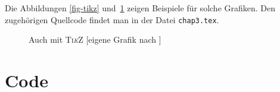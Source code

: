 \newcommand{\foo}[5]{
  \begin{scope}[xshift=#1cm]
    \begin{scope}[x  = {(1cm,0cm)}, y  = {(0.4cm,0.6cm)}, z  = {(0cm,1cm)}]
      \begin{scope}[canvas is xz plane at y=#4]
        \filldraw[black, fill=#3!70!white] ($(0,0) + (0,#5)$) rectangle ($(0.5,#2) + (0,#5)$);
      \end{scope}
      \pgfmathsetmacro{\z}{#2 + #5}
      \begin{scope}[canvas is xy plane at z=\z]
        \filldraw[black, fill=#3!50!white] (0,#4) -- (0.5,#4) -- ($(0.5,1) + (0,#4)$) -- ($(0,1) + (0,#4)$) -- cycle;
      \end{scope}
      \begin{scope}[canvas is yz plane at x=0.5]
        \filldraw[black, fill=#3!90!white] (#4,#5) rectangle ($(1,#2) + (#4,#5)$);
      \end{scope}
    \end{scope}
  \end{scope}
}

Die Abbildungen \ref{fig-tikz} und~\ref{fig-tikz2} zeigen Beispiele für solche
Grafiken.  Den zugehörigen Quellcode findet man in der Datei
\texttt{chap3.tex}.

\begin{figure}[!ht]
  \centering
  \caption[Zweites \textsc{Ti\textit{k}Z}-Beispiel]{Auch mit \textsc{Ti\textit{k}Z} [eigene Grafik nach \parencite[S. 533]{weitz}]}
  \label{fig-tikz2}
\end{figure}

\section{Code}\label{sec-code}


